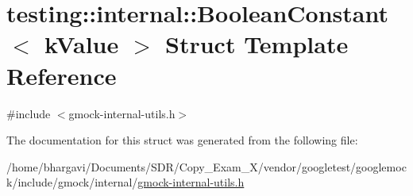 \hypertarget{structtesting_1_1internal_1_1_boolean_constant}{}\section{testing\+:\+:internal\+:\+:Boolean\+Constant$<$ k\+Value $>$ Struct Template Reference}
\label{structtesting_1_1internal_1_1_boolean_constant}


{\ttfamily \#include $<$gmock-\/internal-\/utils.\+h$>$}



The documentation for this struct was generated from the following file\+:\begin{DoxyCompactItemize}
\item 
/home/bhargavi/\+Documents/\+S\+D\+R/\+Copy\+\_\+\+Exam\+\_\+X/vendor/googletest/googlemock/include/gmock/internal/\hyperlink{gmock-internal-utils_8h}{gmock-\/internal-\/utils.\+h}\end{DoxyCompactItemize}
